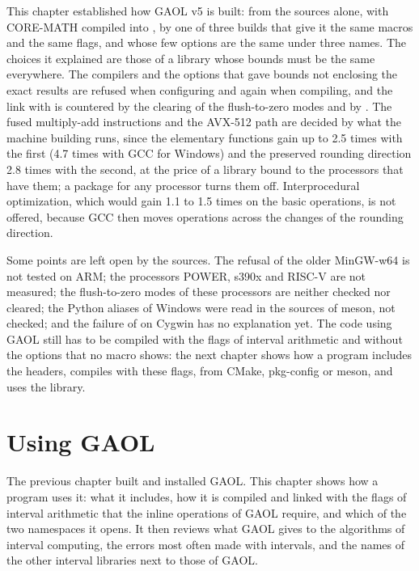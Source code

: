 \documentclass[12pt,a4paper,twoside,openright]{book}
\begin{document}
This chapter established how GAOL v5 is built: from the sources alone, with
CORE-MATH compiled into , by one of three builds that give it
the same macros and the same flags, and whose few options are the same under
three names. The choices it explained are those of a library whose bounds
must be the same everywhere. The compilers and the options that gave bounds
not enclosing the exact results are refused when configuring and again when
compiling, and the link with  is countered by the clearing of
the flush-to-zero modes and by . The fused multiply-add
instructions and the AVX-512 path are decided by what the machine building
runs, since the elementary functions gain up to 2.5 times with the first
(4.7 times with GCC for Windows) and the preserved rounding direction 2.8
times with the second, at the price of a library bound to the processors that
have them; a package for any processor turns them off. Interprocedural
optimization, which would gain 1.1 to 1.5 times on the basic operations, is
not offered, because GCC then moves operations across the changes of the
rounding direction.

\medskip
Some points are left open by the sources. The refusal of the older MinGW-w64
is not tested on ARM; the processors POWER, s390x and RISC-V are not measured;
the flush-to-zero modes of these processors are neither checked nor cleared;
the Python aliases of Windows were read in the sources of meson, not checked;
and the failure of  on Cygwin has no explanation yet.
The code using GAOL still has to be compiled with the flags of interval
arithmetic and without the options that no macro shows: the next chapter
shows how a program includes the headers, compiles with these flags, from
CMake, pkg-config or meson, and uses the library.

\chapter{Using GAOL}\label{chap:overview}

The previous chapter built and installed GAOL. This chapter shows how a
program uses it: what it includes, how it is compiled and linked with the
flags of interval arithmetic that the inline operations of GAOL require, and
which of the two namespaces it opens. It then reviews what GAOL gives to the
algorithms of interval computing, the errors most often made with intervals,
and the names of the other interval libraries next to those of GAOL.
\end{document}
